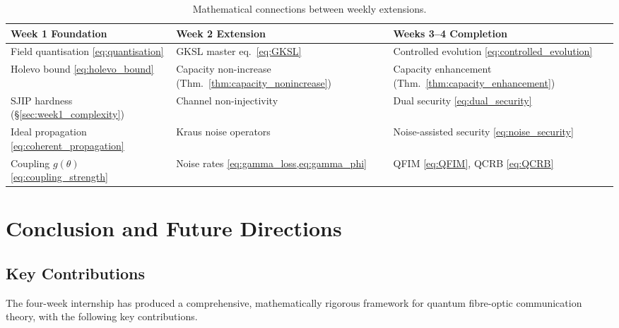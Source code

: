 \documentclass[journal,twocolumn]{IEEEtran}
\theoremstyle{definition}
\theoremstyle{plain}
\begin{document}
\begin{table}[H]
\centering
\caption{Mathematical connections between weekly extensions.}
\renewcommand{\arraystretch}{1.4}
\begin{tabular}{>{\small}p{2.6cm}>{\small}p{2.6cm}>{\small}p{2.6cm}}
\toprule
\textbf{Week 1 Foundation} & \textbf{Week 2 Extension} &
\textbf{Weeks 3--4 Completion} \\
\midrule
Field quantisation \cref{eq:quantisation}
  & GKSL master eq.\ \cref{eq:GKSL}
  & Controlled evolution \cref{eq:controlled_evolution} \\[3pt]
Holevo bound \cref{eq:holevo_bound}
  & Capacity non-increase (Thm.~\ref{thm:capacity_nonincrease})
  & Capacity enhancement (Thm.~\ref{thm:capacity_enhancement}) \\[3pt]
SJIP hardness (\S\ref{sec:week1_complexity})
  & Channel non-injectivity
  & Dual security \cref{eq:dual_security} \\[3pt]
Ideal propagation \cref{eq:coherent_propagation}
  & Kraus noise operators
  & Noise-assisted security \cref{eq:noise_security} \\[3pt]
Coupling $g(\theta)$ \cref{eq:coupling_strength}
  & Noise rates \cref{eq:gamma_loss,eq:gamma_phi}
  & QFIM \cref{eq:QFIM}, QCRB \cref{eq:QCRB} \\
\bottomrule
\end{tabular}
\end{table}

\section{Conclusion and Future Directions}

\subsection{Key Contributions}

The four-week internship has produced a comprehensive, mathematically
rigorous framework for quantum fibre-optic communication theory, with
the following key contributions.
\end{document}
